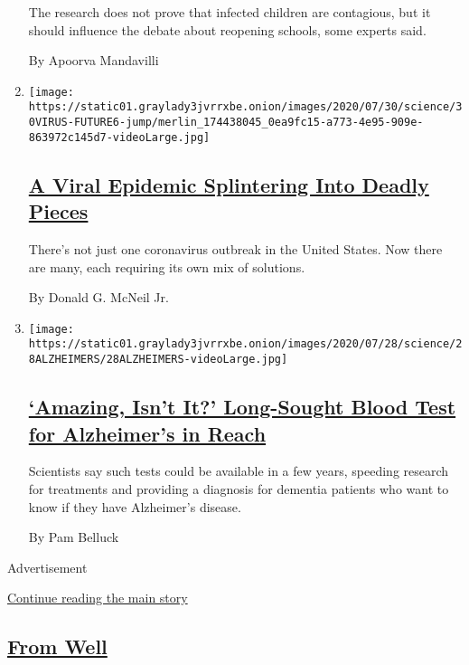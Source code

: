 \begin{enumerate}
  The research does not prove that infected children are contagious, but
  it should influence the debate about reopening schools, some experts
  said.

  By Apoorva Mandavilli
\item
  \texttt{[image: https://static01.graylady3jvrrxbe.onion/images/2020/07/30/science/30VIRUS-FUTURE6-jump/merlin\_174438045\_0ea9fc15-a773-4e95-909e-863972c145d7-videoLarge.jpg]}

  \hypertarget{a-viral-epidemic-splintering-into-deadly-pieces}{%
  \subsection{\texorpdfstring{\href{/2020/07/29/health/coronavirus-future-america.html}{A
  Viral Epidemic Splintering Into Deadly
  Pieces}}{A Viral Epidemic Splintering Into Deadly Pieces}}\label{a-viral-epidemic-splintering-into-deadly-pieces}}

  There's not just one coronavirus outbreak in the United States. Now
  there are many, each requiring its own mix of solutions.

  By Donald G. McNeil Jr.
\item
  \texttt{[image: https://static01.graylady3jvrrxbe.onion/images/2020/07/28/science/28ALZHEIMERS/28ALZHEIMERS-videoLarge.jpg]}

  \hypertarget{amazing-isnt-it-long-sought-blood-test-for-alzheimers-in-reach}{%
  \subsection{\texorpdfstring{\href{/2020/07/28/health/alzheimers-blood-test.html}{`Amazing,
  Isn't It?' Long-Sought Blood Test for Alzheimer's in
  Reach}}{`Amazing, Isn't It?' Long-Sought Blood Test for Alzheimer's in Reach}}\label{amazing-isnt-it-long-sought-blood-test-for-alzheimers-in-reach}}

  Scientists say such tests could be available in a few years, speeding
  research for treatments and providing a diagnosis for dementia
  patients who want to know if they have Alzheimer's disease.

  By Pam Belluck
\end{enumerate}

Advertisement

\protect\hyperlink{after-mid1}{Continue reading the main story}

\hypertarget{from-well}{%
\subsection{\texorpdfstring{\href{/section/well}{From
Well}}{From Well}}\label{from-well}}

